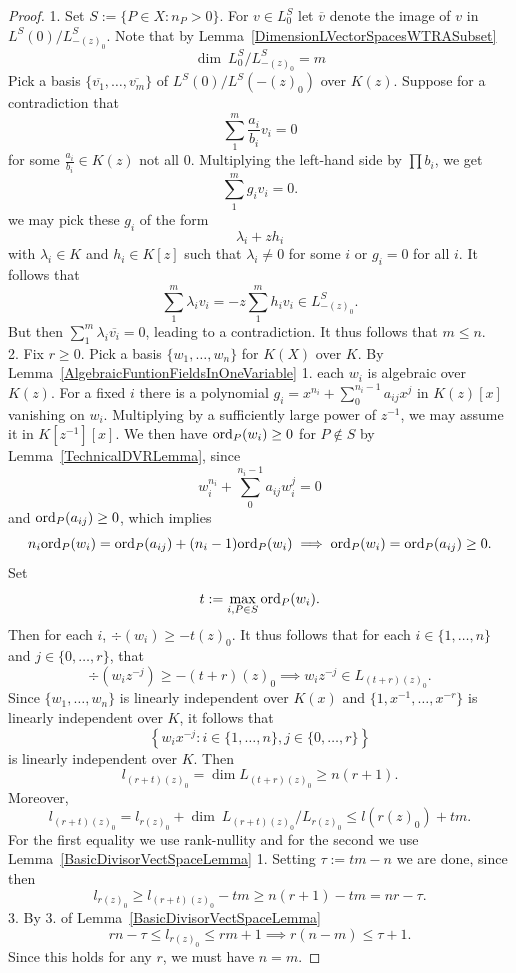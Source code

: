     \begin{proof}
        1. Set $S:= \{P\in X : n_P>0\}$. For $v\in L^S_0$ let $\overline{v}$ denote the image of $v$ in $L^S(0)/L^S_{-(z)_0}$. Note that by Lemma~\ref{DimensionLVectorSpacesWTRASubset}
        $$
            \dim \ L^S_0/L^S_{-(z)_0} = m
        $$
        Pick a basis $\{\overline{v_1},\dots,\overline{v_m}\}$ of $L^{S}(0)/L^S(-(z)_0)$ over $K(z)$. Suppose for a contradiction that 
        $$
            \sum_1^m \frac{a_i}{b_i}v_i  = 0
        $$
        for some $\frac{a_i}{b_i}\in K(z)$ not all $0$. Multiplying the left-hand side by $\prod b_i$, we get 
        $$
            \sum_1^m g_iv_i = 0.
        $$
        we may pick these $g_i$ of the form 
        $$
            \lambda_i + zh_i
        $$
        with $\lambda_i\in K$ and $h_i\in K[z]$ such that $\lambda_i\neq 0$ for some $i$ or $g_i=0$ for all $i$. It follows that 
        $$
            \sum_1^m \lambda_i v_i = -z\sum_1^m h_iv_i\in L_{-(z)_0}^S. 
        $$
        But then $\sum_1^m \lambda_i \overline{v_i} = 0$, leading to a contradiction. It thus follows that $m\leq n$.\\
        2. Fix $r\geq 0$. Pick a basis $\{w_1,\dots,w_n\}$ for $K(X)$ over $K$. By Lemma~\ref{AlgebraicFuntionFieldsInOneVariable} 1. each $w_i$ is algebraic over $K(z)$. For a fixed $i$ there is a polynomial $g_i=x^{n_i}+\sum_0^{n_i-1} a_{ij}x^{j}$ in $K(z)[x]$ vanishing on $w_i$. Multiplying by a sufficiently large power of $z^{-1}$, we may assume it in $K[z^{-1}][x]$. We then have $\mathrm{ord}_P(w_i) \geq0$ for $P\notin S$ by Lemma~\ref{TechnicalDVRLemma}, since 
        $$
            w_i^{n_i}+\sum_0^{n_i-1} a_{ij}w_i^{j} = 0
        $$
        and $\mathrm{ord}_P(a_{ij}) \geq 0$, which implies 
        $$
            n_i\mathrm{ord}_P(w_i) = \mathrm{ord}_{P}(a_{ij})+(n_i-1)\mathrm{ord}_P(w_i) \implies \mathrm{ord}_P(w_i) = \mathrm{ord}_P(a_{ij})\geq0. 
        $$
        Set 
        $$
            t := \max_{i,P\in S} \mathrm{ord}_P(w_i).
        $$
        Then for each $i$, $\div(w_i) \geq -t(z)_0$. It thus follows that for each $i\in\{1,\dots,n\}$ and $j\in \{0,\dots,r\}$, that
        $$
            \div(w_iz^{-j}) \geq -(t+r)(z)_0 \implies w_iz^{-j}\in L_{(t+r)(z)_0}.
        $$
        Since $\{w_1,\dots,w_n\}$ is linearly independent over $K(x)$ and $\{1,x^{-1},\dots,x^{-r}\}$ is linearly independent over $K$, it follows that 
        $$
            \left\{w_ix^{-j} : i\in \{1,\dots,n\}, j\in\{0,\dots,r\}\right\}
        $$
        is linearly independent over $K$. Then 
        $$
            l_{(r+t)(z)_0} = \dim L_{(t+r)(z)_0} \geq n(r+1).
        $$
        Moreover, 
        $$
            l_{(r+t)(z)_0} = l_{r(z)_0} + \dim \ L_{(r+t)(z)_0}/L_{r(z)_0}\leq l(r(z)_0)+tm.
        $$
        For the first equality we use rank-nullity and for the second we use Lemma~\ref{BasicDivisorVectSpaceLemma} 1. Setting $\tau:= tm-n$ we are done, since then 
        $$l_{r(z)_0}\geq l_{(r+t)(z)_0}-tm \geq n(r+1)-tm=nr-\tau.$$
        3. By 3. of Lemma~\ref{BasicDivisorVectSpaceLemma}
        $$
            rn-\tau \leq l_{r(z)_0} \leq rm+1\implies r(n-m) \leq \tau+1.
        $$
        Since this holds for any $r$, we must have $n=m$.
    \end{proof}
